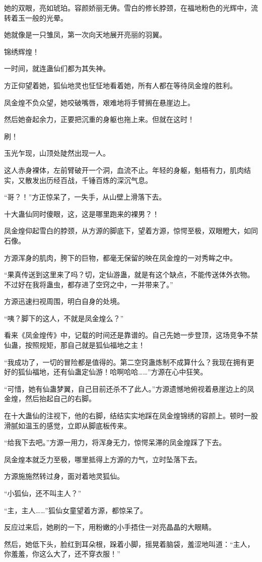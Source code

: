 \begin{this_body}
她的双眼，亮如琥珀。容颜娇丽无俦。雪白的修长脖颈，在福地粉色的光辉中，流转着玉一般的光晕。

她就像是一只雏凤，第一次向天地展开亮丽的羽翼。

锦绣辉煌！

一时间，就连蛊仙们都为其失神。

方正仰望着她，狐仙地灵也怔怔地看着她，所有人都在等待凤金煌的胜利。

凤金煌不负众望，她咬破嘴唇，艰难地将手臂搁在悬崖边上。

然后她奋起余力，正要把沉重的身躯也拖上来。但就在这时！

刷！

玉光乍现，山顶处陡然出现一人。

这人赤身裸体，左前臂破开一个洞，血流不止。年轻的身躯，魁梧有力，肌肉结实，又散发出历经百战，千锤百炼的深沉气息。

“哥？！”方正惊呆了，一失手，从山壁上滑落下去。

十大蛊仙同时傻眼，这，这是哪里跑来的裸男？！

凤金煌仰起雪白的脖颈，从方源的脚底下，望着方源，惊愕至极，双眼瞪大，如同石像。

方源浑身的肌肉，胯下的巨物，都毫无保留的映在凤金煌的一对秀眸之中。

“果真传送到这里来了吗？切，定仙游蛊，就是有这个缺点，不能传送体外衣物。不过好在我将蛊虫，都存进了空窍之中，一并带来了。”

方源迅速扫视周围，明白自身的处境。

“咦？脚下的这人，不就是凤金煌么？”

看来《凤金煌传》中，记载的时间还是靠谱的。自己先她一步登顶，这场竞争不禁仙蛊，按照规矩，那自己就是狐仙福地之主！

“我成功了，一切的冒险都是值得的。第二空窍蛊炼制不成算什么？我现在拥有更好的狐仙福地，还有仙蛊定仙游！哈啊哈哈……”方源在心中狂笑。

“可惜，她有仙蛊梦翼，自己目前还杀不了此人。”方源遗憾地俯视着悬崖边上的凤金煌，然后抬起自己的右脚。

在十大蛊仙的注视下，他的右脚，结结实实地踩在凤金煌锦绣的容颜上。顿时一股滑腻如温玉的感觉，立即从脚底板传来。

“给我下去吧。”方源一用力，将浑身无力，惊愕呆滞的凤金煌踩了下去。

凤金煌本就乏力至极，哪里抵得上方源的力气，立时坠落下去。

方源施施然转过身，面对着地灵狐仙。

“小狐仙，还不叫主人？”

“主，主人……”狐仙女童望着方源，都惊呆了。

反应过来后，她刷的一下，用粉嫩的小手捂住一对亮晶晶的大眼睛。

然后，她低下头，脸红到耳朵根，跺着小脚，摇晃着脑袋，羞涩地叫道：“主人，你羞羞，你这么大了，还不穿衣服！”

\end{this_body}

